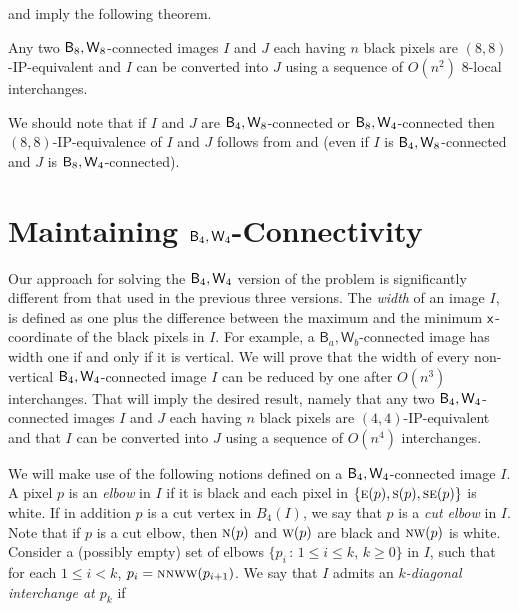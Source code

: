 \documentclass[lotsofwhite,charterfonts]{patmorin}
\newcommand{\foureight}{\ensuremath{\protect\textup{\textsf{B}}_{4},\protect\textup{\textsf{W}}_{8}}}
\newcommand{\eightfour}{\ensuremath{\protect\textup{\textsf{B}}_{8},\protect\textup{\textsf{W}}_{4}}}
\newcommand{\eighteight}{\ensuremath{\protect\textup{\textsf{B}}_{8},\protect\textup{\textsf{W}}_{8}}}
\newcommand{\fourfour}{\ensuremath{\protect\textup{\textsf{B}}_{4},\protect\textup{\textsf{W}}_{4}}}
\newcommand{\N}{\textsc{n}}
\newcommand{\E}{\textsc{e}}
\newcommand{\SE}{\textsc{se}}
\renewcommand{\S}{\textsc{s}}
\newcommand{\W}{\textsc{w}}
\newcommand{\NW}{\textsc{nw}}
\newcommand{\x}{\ensuremath{\protect\textup{\textsf{x}}}}
\newcommand{\ic}[2]{\langle #1,#2 \rangle}
\begin{document}
 and  imply the following theorem.


\begin{thm}
Any two \eighteight-connected images $I$ and $J$ each having $n$
black pixels are $(8,8)$-IP-equivalent and $I$ can be converted into
$J$ using a sequence of $O(n^2)$ 8-local interchanges.
\end{thm}


We should note that if $I$ and $J$ are \foureight-connected or
\eightfour-connected then $(8,8)$-IP-equivalence of $I$ and $J$
follows from  and  (even if $I$ is
\foureight-connected and $J$ is \eightfour-connected).



\section{Maintaining \fourfour-Connectivity}

Our approach for solving the $\fourfour$ version of the problem is
significantly different from that used in the previous three versions.
The \emph{width} of an image $I$, is defined as one plus the
difference between the maximum and the minimum \x-coordinate of the
black pixels in $I$. For example, a
$\textsf{B}_a,\textsf{W}_b$-connected image has width one if and only
if it is vertical. We will prove that the width of every non-vertical
\fourfour-connected image $I$ can be reduced by one after $O(n^3)$
interchanges. That will imply the desired result, namely that any two
\fourfour-connected images $I$ and $J$ each having $n$ black pixels
are $(4,4)$-IP-equivalent and that $I$ can be converted into $J$ using
a sequence of $O(n^4)$ interchanges.

We will make use of the following notions defined on a
\fourfour-connected image $I$. A pixel $p$ is an \emph{elbow} in $I$
if it is black and each pixel in $\{\E(p), \S(p), \SE(p)\}$ is white.
If in addition $p$ is a cut vertex in $B_4(I)$, we say that $p$ is a
\emph{cut elbow} in $I$. Note that if $p$ is a cut elbow, then $\N(p)$
and $\W(p)$ are black and $\NW(p)$ is white. Consider a (possibly
empty) set of elbows $\{p_i\, :\, 1\leq i\leq k, \, k\geq 0\}$ in $I$,
such that for each $1\leq i< k$, $p_i=\N\N\W\W(p_{i+1})$. We say that
$I$ admits an \emph{$k$-diagonal interchange at $p_k$} if 

\end{document}
